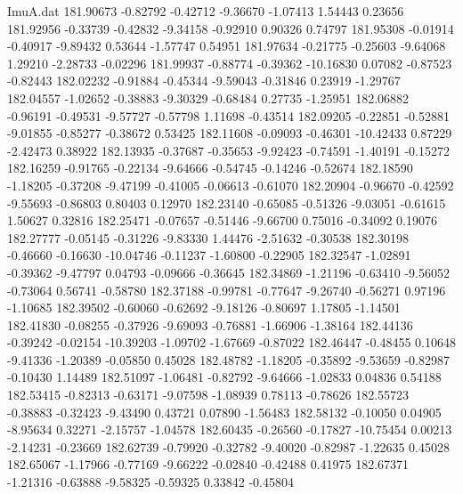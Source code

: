 \begin{filecontents}{ImuA.dat}
 181.90673   -0.82792   -0.42712   -9.36670   -1.07413    1.54443    0.23656
 181.92956   -0.33739   -0.42832   -9.34158   -0.92910    0.90326    0.74797
 181.95308   -0.01914   -0.40917   -9.89432    0.53644   -1.57747    0.54951
 181.97634   -0.21775   -0.25603   -9.64068    1.29210   -2.28733   -0.02296
 181.99937   -0.88774   -0.39362  -10.16830    0.07082   -0.87523   -0.82443
 182.02232   -0.91884   -0.45344   -9.59043   -0.31846    0.23919   -1.29767
 182.04557   -1.02652   -0.38883   -9.30329   -0.68484    0.27735   -1.25951
 182.06882   -0.96191   -0.49531   -9.57727   -0.57798    1.11698   -0.43514
 182.09205   -0.22851   -0.52881   -9.01855   -0.85277   -0.38672    0.53425
 182.11608   -0.09093   -0.46301  -10.42433    0.87229   -2.42473    0.38922
 182.13935   -0.37687   -0.35653   -9.92423   -0.74591   -1.40191   -0.15272
 182.16259   -0.91765   -0.22134   -9.64666   -0.54745   -0.14246   -0.52674
 182.18590   -1.18205   -0.37208   -9.47199   -0.41005   -0.06613   -0.61070
 182.20904   -0.96670   -0.42592   -9.55693   -0.86803    0.80403    0.12970
 182.23140   -0.65085   -0.51326   -9.03051   -0.61615    1.50627    0.32816
 182.25471   -0.07657   -0.51446   -9.66700    0.75016   -0.34092    0.19076
 182.27777   -0.05145   -0.31226   -9.83330    1.44476   -2.51632   -0.30538
 182.30198   -0.46660   -0.16630  -10.04746   -0.11237   -1.60800   -0.22905
 182.32547   -1.02891   -0.39362   -9.47797    0.04793   -0.09666   -0.36645
 182.34869   -1.21196   -0.63410   -9.56052   -0.73064    0.56741   -0.58780
 182.37188   -0.99781   -0.77647   -9.26740   -0.56271    0.97196   -1.10685
 182.39502   -0.60060   -0.62692   -9.18126   -0.80697    1.17805   -1.14501
 182.41830   -0.08255   -0.37926   -9.69093   -0.76881   -1.66906   -1.38164
 182.44136   -0.39242   -0.02154  -10.39203   -1.09702   -1.67669   -0.87022
 182.46447   -0.48455    0.10648   -9.41336   -1.20389   -0.05850    0.45028
 182.48782   -1.18205   -0.35892   -9.53659   -0.82987   -0.10430    1.14489
 182.51097   -1.06481   -0.82792   -9.64666   -1.02833    0.04836    0.54188
 182.53415   -0.82313   -0.63171   -9.07598   -1.08939    0.78113   -0.78626
 182.55723   -0.38883   -0.32423   -9.43490    0.43721    0.07890   -1.56483
 182.58132   -0.10050    0.04905   -8.95634    0.32271   -2.15757   -1.04578
 182.60435   -0.26560   -0.17827  -10.75454    0.00213   -2.14231   -0.23669
 182.62739   -0.79920   -0.32782   -9.40020   -0.82987   -1.22635    0.45028
 182.65067   -1.17966   -0.77169   -9.66222   -0.02840   -0.42488    0.41975
 182.67371   -1.21316   -0.63888   -9.58325   -0.59325    0.33842   -0.45804

\end{filecontents}
